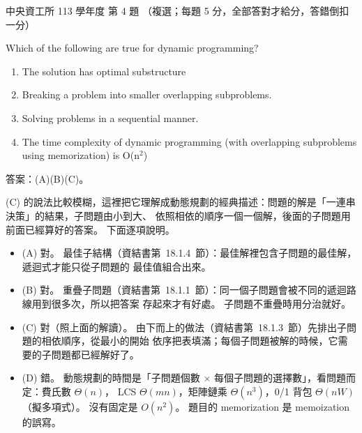 \begin{pastexam}[label={px:ncu-113-dsa-04}]{中央資工所 113 學年度 第 4 題}
（複選；每題 5 分，全部答對才給分，答錯倒扣一分）

Which of the following are true for dynamic programming?
\begin{enumerate}[label=(\Alph*)]
\item The solution has optimal substructure
\item Breaking a problem into smaller overlapping subproblems.
\item Solving problems in a sequential manner.
\item The time complexity of dynamic programming (with overlapping subproblems using memorization) is O(n$^2$)
\end{enumerate}
\end{pastexam}

\begin{pastsoln}
答案：(A)(B)(C)。

(C) 的說法比較模糊，這裡把它理解成動態規劃的經典描述：問題的解是「一連串決策」的結果，子問題由小到大、
依照相依的順序一個一個解，後面的子問題用前面已經算好的答案。 下面逐項說明。

\begin{itemize}
\item (A) 對。 最佳子結構（資結書第~18.1.4~節）：最佳解裡包含子問題的最佳解，遞迴式才能只從子問題的
最佳值組合出來。
\item (B) 對。 重疊子問題（資結書第~18.1.1~節）：同一個子問題會被不同的遞迴路線用到很多次，所以把答案
存起來才有好處。 子問題不重疊時用分治就好。
\item (C) 對（照上面的解讀）。 由下而上的做法（資結書第~18.1.3~節）先排出子問題的相依順序，從最小的開始
依序把表填滿；每個子問題被解的時候，它需要的子問題都已經解好了。
\item (D) 錯。 動態規劃的時間是「子問題個數 $\times$ 每個子問題的選擇數」，看問題而定：費氏數 $\Theta(n)$，
LCS $\Theta(mn)$，矩陣鏈乘 $\Theta(n^3)$，0/1 背包 $\Theta(nW)$（擬多項式）。 沒有固定是 $O(n^2)$。
題目的 memorization 是 memoization 的誤寫。
\end{itemize}
\end{pastsoln}
